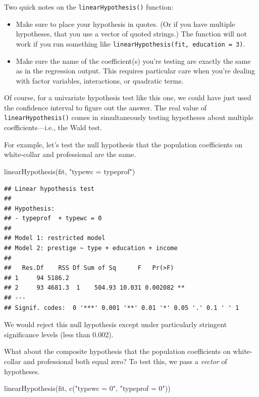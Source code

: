 \documentclass[
  12pt,
  oneside,openany]{book}
\newenvironment{Shaded}{\begin{snugshade}}{\end{snugshade}}
\newcommand{\FunctionTok}[1]{\textcolor[rgb]{0.00,0.00,0.00}{#1}}
\newcommand{\NormalTok}[1]{#1}
\newcommand{\StringTok}[1]{\textcolor[rgb]{0.31,0.60,0.02}{#1}}
\begin{document}
Two quick notes on the \texttt{linearHypothesis()} function:

\begin{itemize}
\item
  Make sure to place your hypothesis in quotes. (Or if you have multiple hypotheses, that you use a vector of quoted strings.) The function will not work if you run something like \texttt{linearHypothesis(fit,\ education\ =\ 3)}.
\item
  Make sure the name of the coefficient(s) you're testing are exactly the same as in the regression output. This requires particular care when you're dealing with factor variables, interactions, or quadratic terms.
\end{itemize}

Of course, for a univariate hypothesis test like this one, we could have just used the confidence interval to figure out the answer. The real value of \texttt{linearHypothesis()} comes in simultaneously testing hypotheses about multiple coefficients---i.e., the Wald test.

For example, let's test the null hypothesis that the population coefficients on white-collar and professional are the same.

\begin{Shaded}
\begin{Highlighting}[]
\FunctionTok{linearHypothesis}\NormalTok{(fit, }\StringTok{"typewc = typeprof"}\NormalTok{)}
\end{Highlighting}
\end{Shaded}

\begin{verbatim}
## Linear hypothesis test
## 
## Hypothesis:
## - typeprof  + typewc = 0
## 
## Model 1: restricted model
## Model 2: prestige ~ type + education + income
## 
##   Res.Df    RSS Df Sum of Sq      F   Pr(>F)   
## 1     94 5186.2                                
## 2     93 4681.3  1    504.93 10.031 0.002082 **
## ---
## Signif. codes:  0 '***' 0.001 '**' 0.01 '*' 0.05 '.' 0.1 ' ' 1
\end{verbatim}

We would reject this null hypothesis except under particularly stringent significance levels (less than 0.002).

What about the composite hypothesis that the population coefficients on white-collar and professional both equal zero? To test this, we pass a \emph{vector} of hypotheses.

\begin{Shaded}
\begin{Highlighting}[]
\FunctionTok{linearHypothesis}\NormalTok{(fit, }\FunctionTok{c}\NormalTok{(}\StringTok{"typewc = 0"}\NormalTok{, }\StringTok{"typeprof = 0"}\NormalTok{))}
\end{Highlighting}
\end{Shaded}
\end{document}
